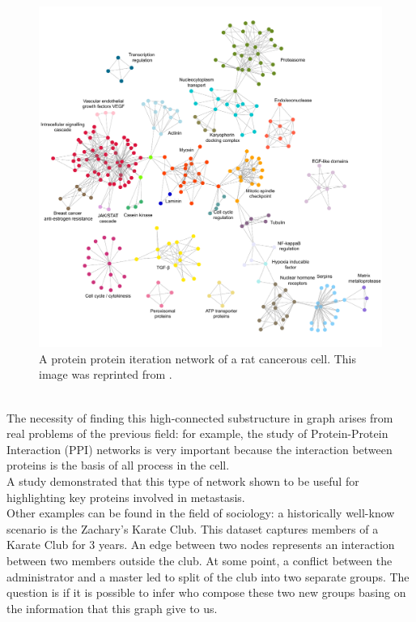 \begin{figure}[h]
	\centering
	\includegraphics[width=1\linewidth]{0-resources/ppi}
	\caption{A protein protein iteration network of a rat cancerous cell. This image was reprinted from \cite{metastasis}.}
	\label{fig:ppi}
\end{figure}\\
The necessity of finding this high-connected substructure in graph arises from real problems of the previous field: for example, the study of Protein-Protein Interaction (PPI) networks is very important because the interaction between proteins is the basis of all process in the cell.\\ A study demonstrated that this type of network shown to be useful for highlighting key proteins involved in metastasis. \cite{metastasis} \\
Other examples can be found in the field of sociology: a historically well-know scenario is the Zachary's Karate Club. This dataset captures members of a Karate Club for 3 years.\cite{Zac77} An edge between two nodes represents an interaction between two members outside the club. At some point, a conflict between the administrator and a master led to split of the club into two separate groups. The question is if it is possible to infer who compose these two new groups basing on the information that this graph give to us. 
